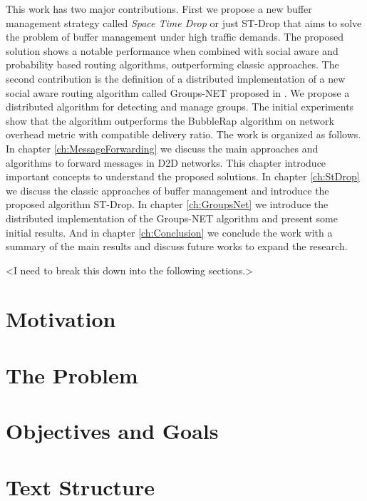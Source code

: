 This work has two major contributions. First we propose a new buffer management strategy called \textit{Space Time Drop} or just ST-Drop that aims to solve the problem of buffer management under high traffic demands.
The proposed solution shows a notable performance when combined with social aware and probability based routing algorithms, outperforming classic approaches.
The second contribution is the definition of a distributed implementation of a new social aware routing algorithm called Groups-NET proposed in \cite{nunes2016leveraging}.
We propose a distributed algorithm for detecting and manage groups. The initial experiments show that the algorithm outperforms the BubbleRap algorithm on network overhead metric with compatible delivery ratio.
The work is organized as follows. In chapter \ref{ch:MessageForwarding} we discuss the main approaches and algorithms to forward messages in D2D networks. This chapter introduce important
concepts to understand the proposed solutions. In chapter \ref{ch:StDrop} we discuss the classic approaches of buffer management and introduce the proposed algorithm ST-Drop.
In chapter \ref{ch:GroupsNet} we introduce the distributed implementation of the Groups-NET algorithm and present some initial results. And in chapter \ref{ch:Conclusion} we conclude the work
with a summary of the main results and discuss future works to expand the research.

<I need to break this down into the following sections.>

\section{Motivation}
\label{sec:intro.motivation}

\section{The Problem}
\label{sec:intro.problemStatement}

\section{Objectives and Goals}
\label{sec:intro.motivation}

\section{Text Structure}
\label{sec:intro.motivation}


